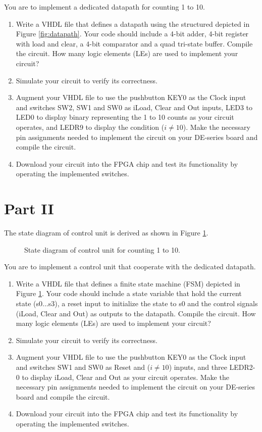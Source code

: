 \documentclass{article}
\begin{document}
You are to implement a dedicated datapath for counting 1 to 10.

\begin{enumerate}
    \item Write a VHDL file that defines a datapath using the structured depicted in Figure \ref{fig:datapath}. Your code should include a 4-bit adder, 4-bit register with load and clear, a 4-bit comparator and a quad tri-state buffer. Compile the circuit. How many logic elements (LEs) are used to implement your circuit?
    \item Simulate your circuit to verify its correctness.
    \item Augment your VHDL file to use the pushbutton KEY0 as the Clock input and switches SW2, SW1 and SW0 as iLoad, Clear and Out inputs, LED3 to LED0 to display binary representing the 1 to 10 counts as your circuit operates, and LEDR9 to display the condition ($i \neq 10$). Make the necessary pin assignments needed to implement the circuit on your DE-series board and compile the circuit.
    \item Download your circuit into the FPGA chip and test its functionality by operating the implemented switches.
\end{enumerate}

\section*{Part II}

The state diagram of control unit is derived as shown in Figure \ref{fig:fsm}.

\begin{figure}[H]
    \centering
    
    \caption{State diagram of control unit for counting 1 to 10.}
    \label{fig:fsm}
\end{figure}

You are to implement a control unit that cooperate with the dedicated datapath.

\begin{enumerate}
    \item Write a VHDL file that defines a finite state machine (FSM) depicted in Figure \ref{fig:fsm}. Your code should include a state variable that hold the current state (s0...s3), a reset input to initialize the state to s0 and the control signals (iLoad, Clear and Out) as outputs to the datapath. Compile the circuit. How many logic elements (LEs) are used to implement your circuit?
    \item Simulate your circuit to verify its correctness.
    \item Augment your VHDL file to use the pushbutton KEY0 as the Clock input and switches SW1 and SW0 as Reset and ($i \neq 10$) inputs, and three LEDR2-0 to display iLoad, Clear and Out as your circuit operates. Make the necessary pin assignments needed to implement the circuit on your DE-series board and compile the circuit.
    \item Download your circuit into the FPGA chip and test its functionality by operating the implemented switches.
\end{enumerate}
\end{document}
